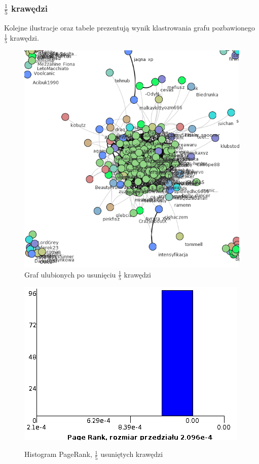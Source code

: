 \documentclass[10pt,a4paper]{article}
\begin{document}
\subsubsection {$\frac{1}{5}$ krawędzi}
  Kolejne ilustracje oraz tabele prezentują wynik klastrowania grafu pozbawionego  $\frac{1}{5}$  krawędzi.
\begin{figure}[H]
\centering
\caption{Graf ulubionych po usunięciu $\frac{1}{5}$ krawędzi}
\includegraphics[scale=0.5]{wyniki/final200Loved/1200loved.png}
\end{figure}

\begin{figure}[H]
\centering
\caption{Histogram PageRank, $\frac{1}{5}$ usuniętych krawędzi}
\includegraphics[scale=0.6]{wyniki/final200Loved/1200lovedPRHist.png}
\label{fig:1200lovedPRHist}
\end{figure}
\end{document}
